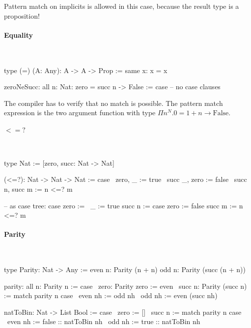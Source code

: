 Pattern match on implicits is allowed in this case, because the result type is a
proposition!




\paragraph{Equality}

\ \begin{alba}
    type (=) (A: Any): A -> A -> Prop :=
        same {x}: x = x

    zeroNeSucc: all {n: Nat}: zero = succ n -> False :=
        case
            -- no case clauses
\end{alba}

The compiler has to verify that no match is possible. The pattern match
expression is the two argument function with type $\Pi n^N. 0 = 1 + n \to
\text{False}$.



\paragraph{$<=?$}
\ \begin{alba}
    type Nat := [zero, succ: Nat -> Nat]

    (<=?): Nat -> Nat -> Nat := case
        \ zero,   _      :=  true
        \ succ _, zero   :=  false
        \ succ n, succ m :=  n <=? m

    -- as case tree:
    case
        zero           :=   \ _ := true
        succ n :=
            case
                zero   :=   false
                succ m :=   n <=? m
\end{alba}


\paragraph{Parity}
\ \begin{alba}
    type Parity: Nat -> Any :=
        even n: Parity (n + n)
        odd  n: Parity (succ (n + n))

    parity: all n: Parity n := case
        \ zero: Parity zero :=
            even
        \ succ n: Parity (succ n) :=
            match parity n case
                \ even nh :=
                    odd nh
                \ odd nh :=
                    even (succ nh)

    natToBin: Nat -> List Bool := case
        \ zero :=
            []
        \ succ n :=
            match parity n case
                \ even nh :=
                    false :: natToBin nh
                \ odd nh :=
                    true :: natToBin nh
\end{alba}
